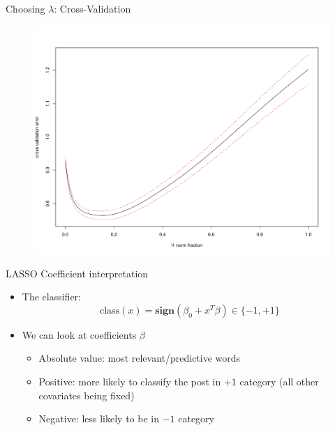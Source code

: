 \documentclass[12pt]{beamer}
\newcommand{\1}[1]{{\mathbf 1}\left\{#1\right\}}        %
\begin{document}
\begin{frame}{Choosing $\lambda$: Cross-Validation}

\begin{figure}
  \centering
  \includegraphics[height=0.9\textheight]{./../../lassoResults/CVPosErr.pdf} 
\end{figure}

\end{frame}


\begin{frame}{LASSO Coefficient interpretation} 

\begin{itemize}[<+->]
\item The classifier:
\[
\text{class}(x) = \textbf{sign}(\beta_0+x^T\beta)\in\{-1,+1\}
\]
\item We can look at coefficients $\beta$

	\begin{itemize}
	\item Absolute value: most relevant/predictive words
	\item Positive: more likely to classify the post in $+1$ category (all other covariates being fixed)
	\item Negative: less likely to be in $-1$ category	
	\end{itemize}
	
\end{itemize}

\end{frame}
\end{document}
